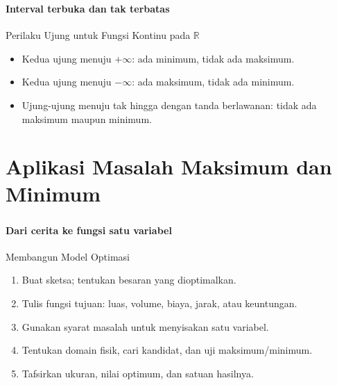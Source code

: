 \documentclass{../../kalkulus-ppt}
\begin{document}
\begin{frame}
\frametitle{\insertsection}
\framesubtitle{Interval terbuka dan tak terbatas}

\begin{block}{Perilaku Ujung untuk Fungsi Kontinu pada $\mathbb R$}
\begin{itemize}
\item Kedua ujung menuju $+\infty$: ada minimum, tidak ada maksimum.
\item Kedua ujung menuju $-\infty$: ada maksimum, tidak ada minimum.
\item Ujung-ujung menuju tak hingga dengan tanda berlawanan: tidak ada maksimum maupun minimum.
\end{itemize}\end{block}
\end{frame}

\section{Aplikasi Masalah Maksimum dan Minimum}

\begin{frame}
\frametitle{\insertsection}
\framesubtitle{Dari cerita ke fungsi satu variabel}

\begin{block}{Membangun Model Optimasi}\begin{enumerate}
\item Buat sketsa; tentukan besaran yang dioptimalkan.
\item Tulis fungsi tujuan: luas, volume, biaya, jarak, atau keuntungan.
\item Gunakan syarat masalah untuk menyisakan satu variabel.
\item Tentukan domain fisik, cari kandidat, dan uji maksimum/minimum.
\item Tafsirkan ukuran, nilai optimum, dan satuan hasilnya.
\end{enumerate}\end{block}
\end{frame}
\end{document}
